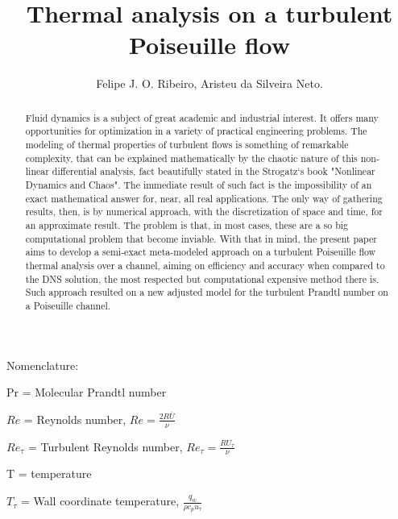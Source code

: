 \documentclass[10pt]{article} %
\title{ \loll Thermal analysis on a turbulent Poiseuille flow}
\author{Felipe J. O. Ribeiro, Aristeu da Silveira Neto.}
\begin{document}
\maketitle


\begin{abstract}
	\noindent Fluid dynamics is a subject of great academic and industrial interest. It offers many opportunities for optimization in a variety of practical engineering problems. The modeling of thermal properties of turbulent flows is something of remarkable complexity, that can be explained mathematically by the chaotic nature of this non-linear differential analysis, fact beautifully stated in the Strogatz`s book "Nonlinear Dynamics and Chaos". The immediate result of such fact is the impossibility of an exact mathematical answer for, near, all real applications. The only way of gathering results, then, is by numerical approach, with the discretization of space and time, for an approximate result. The problem is that, in most cases, these are a so big computational problem that become inviable. With that in mind, the present paper aims to develop a semi-exact meta-modeled approach on a turbulent Poiseuille flow thermal analysis over a channel, aiming on efficiency and accuracy when compared to the DNS solution, the most respected but computational expensive method there is. Such approach resulted on a new adjusted model for the turbulent Prandtl number on a Poiseuille channel.
\end{abstract} 

\vspace{8.0mm}

\begin{LARGE}
	Nomenclature: 
\end{LARGE} 


	Pr = Molecular Prandtl number
	
	
	
	
	$Re$ = Reynolds number, $Re = \frac{2R \overline{U}}{\nu}$
	
	
	$Re_\tau$ = Turbulent Reynolds number, $Re_\tau = \frac{R U_\tau}{\nu}$
	
	
	
	T = temperature
	
	
	
	$T_\tau$ = Wall coordinate temperature, $\frac{q_w}{\rho c_p u_\tau}$ 
	
\end{document}
